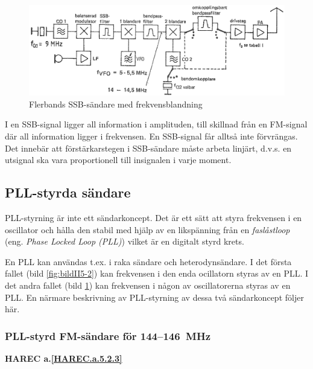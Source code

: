 \begin{figure}
  \includegraphics[width=\textwidth]{images/cropped_pdfs/bild_2_5-06.pdf}
  \caption{Flerbands SSB-sändare med frekvensblandning}
  \label{fig:bildII5-6}
\end{figure}

I en SSB-signal ligger all information i amplituden, till skillnad
från en FM-signal där all information ligger i frekvensen.
En SSB-signal får alltså inte förvrängas.
Det innebär att förstärkarstegen i SSB-sändare måste arbeta linjärt, d.v.s. en
utsignal ska vara proportionell till insignalen i varje moment.

\subsection{PLL-styrda sändare}

PLL-styrning är inte ett sändarkoncept. Det är ett sätt att styra
frekvensen i en oscillator och hålla den stabil med hjälp av en
likspänning från en \emph{faslåstloop} (eng. \emph{Phase Locked Loop (PLL)})
vilket är en digitalt styrd krets.

En PLL kan användas t.ex. i raka sändare och heterodynsändare.
I det första fallet (bild \ref{fig:bildII5-2}) kan frekvensen i den enda
ocillatorn styras av en PLL.
I det andra fallet (bild \ref{fig:bildII5-6}) kan frekvensen i
någon av oscillatorerna styras av en PLL.
En närmare beskrivning av PLL-styrning av dessa två sändarkoncept följer här.

\subsubsection{PLL-styrd FM-sändare för 144--146~MHz}
\textbf{HAREC
  a.\ref{HAREC.a.5.2.3}\label{myHAREC.a.5.2.3}
}

